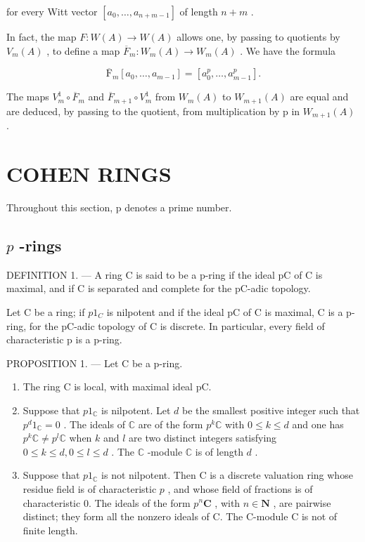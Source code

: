 for every Witt vector \([a_0, \dots, a_{n+m-1}]\) of length \(n + m\) .

In fact, the map \(F:W(A)\to W(A)\) allows one, by passing to quotients by \(V_{m}(A)\) , to define a map \(\overline{F}_{m}:W_{m}(A)\to W_{m}(A)\) . We have the formula

\[
\overline {{{{\mathrm{F}}}}} _ {m} \left[ a _ {0}, \dots , a _ {m - 1} \right] = \left[ a _ {0} ^ {p}, \dots , a _ {m - 1} ^ {p} \right].
\]

The maps \(V_{m}^{1} \circ \overline{F}_{m}\) and \(\overline{F}_{m+1} \circ V_{m}^{1}\) from \(W_{m}(A)\) to \(W_{m+1}(A)\) are equal and are deduced, by passing to the quotient, from multiplication by p in \(W_{m+1}(A)\) .

\section{COHEN RINGS}

Throughout this section, p denotes a prime number.

\subsection{\texorpdfstring{\(p\) -rings}{p-rings}}

DEFINITION 1. --- A ring C is said to be a p-ring if the ideal pC of C is maximal, and if C is separated and complete for the pC-adic topology.

Let C be a ring; if \(p1_{C}\) is nilpotent and if the ideal pC of C is maximal, C is a p-ring, for the pC-adic topology of C is discrete. In particular, every field of characteristic p is a p-ring.

PROPOSITION 1. --- Let C be a p-ring.

\begin{enumerate}
\def\labelenumi{\alph{enumi})}
\item
  The ring C is local, with maximal ideal pC.
\item
  Suppose that \(p1_{\mathbb{C}}\) is nilpotent. Let \(d\) be the smallest positive integer such that \(p^{d}1_{\mathbb{C}} = 0\) . The ideals of \(\mathbb{C}\) are of the form \(p^{k}\mathbb{C}\) with \(0 \leqslant k \leqslant d\) and one has \(p^{k}\mathbb{C} \neq p^{l}\mathbb{C}\) when \(k\) and \(l\) are two distinct integers satisfying \(0 \leqslant k \leqslant d, 0 \leqslant l \leqslant d\) . The \(\mathbb{C}\) -module \(\mathbb{C}\) is of length \(d\) .
\item
  Suppose that \(p1_{\mathbb{C}}\) is not nilpotent. Then C is a discrete valuation ring whose residue field is of characteristic \(p\) , and whose field of fractions is of characteristic 0. The ideals of the form \(p^{n}\mathbf{C}\) , with \(n \in \mathbf{N}\) , are pairwise distinct; they form all the nonzero ideals of C. The C-module C is not of finite length.
\end{enumerate}

